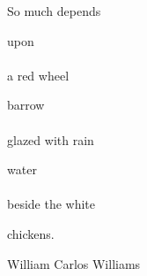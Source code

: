 \documentclass[../main.tex]{subfiles}
\begin{document}
\vspace*{\fill}
\epigraph{So much depends

upon
\\~\\
a red wheel

barrow
\\~\\
glazed with rain

water
\\~\\
beside the white

chickens.}{William Carlos Williams}
\end{document}
